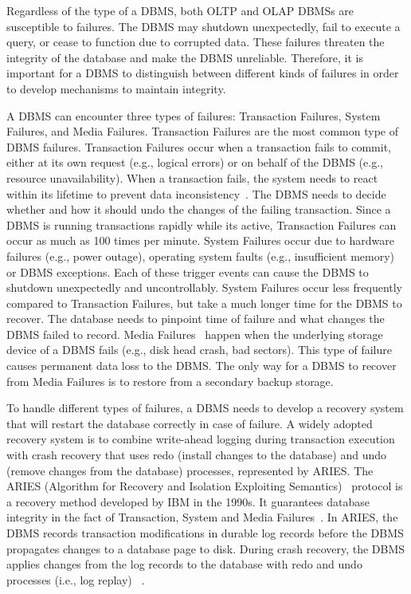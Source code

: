 \documentclass[12pt]{cmuthesis}
\begin{document}
Regardless of the type of a DBMS, both OLTP and OLAP DBMSs are susceptible to failures. The DBMS may shutdown unexpectedly, fail to execute a query, or cease to function due to corrupted data. These failures threaten the integrity of the database and make the DBMS unreliable. Therefore, it is important for a DBMS to distinguish between different kinds of failures in order to develop mechanisms to maintain integrity.

A DBMS can encounter three types of failures: Transaction Failures, System Failures, and Media Failures\cite{theo83}. Transaction Failures are the most common type of DBMS failures. Transaction Failures occur when a transaction fails to commit, either at its own request (e.g., logical errors) or on behalf of the DBMS (e.g., resource unavailability). When a transaction fails, the system needs to react within its lifetime to prevent data inconsistency~\cite{aries}. The DBMS needs to decide whether and how it should undo the changes of the failing transaction. Since a DBMS is running transactions rapidly while its active, Transaction Failures can occur as much as 100 times per minute\cite{theo83}. System Failures occur due to hardware failures (e.g., power outage), operating system faults (e.g., insufficient memory) or DBMS exceptions. Each of these trigger events can cause the DBMS to shutdown unexpectedly and uncontrollably. System Failures occur less frequently compared to Transaction Failures, but take a much longer time for the DBMS to recover. The database needs to pinpoint time of failure and what changes the DBMS failed to record. Media Failures~\cite{sauer17} happen when the underlying storage device of a DBMS fails (e.g., disk head crash, bad sectors). This type of failure causes permanent data loss to the DBMS. The only way for a DBMS to recover from Media Failures is to restore from a secondary backup storage.

To handle different types of failures, a DBMS needs to develop a recovery system that will restart the database correctly in case of failure. A widely adopted recovery system is to combine write-ahead logging during transaction execution with crash recovery that uses redo (install changes to the database) and undo (remove changes from the database) processes, represented by ARIES\cite{malviya14}. The ARIES (Algorithm for Recovery and Isolation Exploiting Semantics)~\cite{aries} protocol is a recovery method developed by IBM in the 1990s. It guarantees database integrity in the fact of Transaction, System and Media Failures~\cite{aries}. In ARIES, the DBMS records transaction modifications in durable log records before the DBMS propagates changes to a database page to disk. During crash recovery, the DBMS applies changes from the log records to the database with redo and undo processes (i.e., log replay) ~\cite{franklin97}.
\end{document}
